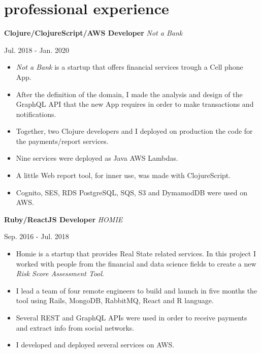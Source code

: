 \documentclass[]{k-cv}
\begin{document}
\newpage

\section{professional experience}

  \textbf{Clojure/ClojureScript/AWS Developer}  \textit{Not a Bank}
  {\color{gray} {\small Jul. 2018 - Jan. 2020 \par}}
  \begin{itemize}
    \item \textit{Not a Bank} is a startup that offers financial services trough a Cell phone App.
    \item After the definition of the domain, I made the analysis and design of the GraphQL API that the new App
          requires in order to make transactions and notifications.
    \item Together, two Clojure developers and I deployed on production the code for the \linebreak
          payments/report services.
    \item Nine services were deployed as Java AWS Lambdas.
    \item A little Web report tool, for inner use, was made with ClojureScript.
    \item Cognito, SES, RDS PostgreSQL, SQS, S3 and DymamodDB were used on AWS.
  \end{itemize}

  \textbf{Ruby/ReactJS Developer}  \textit{HOMIE}
  {\color{gray} {\small Sep. 2016 - Jul. 2018 \par}}
  \begin{itemize}
    \item Homie is a startup that provides Real State related services. In this project I
          worked with people from the financial and data science fields to create a new
          \textit{Risk Score Assessment Tool}.
    \item I lead a team of four remote engineers to build and launch in five months the tool
          using Rails, MongoDB, RabbitMQ, React and R language.
    \item Several REST and GraphQL APIs were used in order to receive payments and extract info from social networks.
    \item I developed and deployed several services on AWS.
  \end{itemize}
\end{document}

